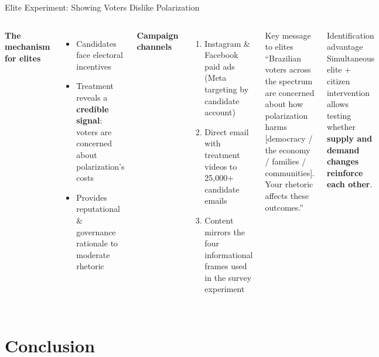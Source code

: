 \documentclass[aspectratio=169]{beamer}
\begin{document}
\begin{frame}{Elite Experiment: Showing Voters Dislike Polarization}
  \begin{columns}[T]
      \textbf{The mechanism for elites}
      \begin{itemize}
        \item Candidates face electoral incentives
        \item Treatment reveals a \textbf{credible signal}: voters are concerned about polarization's costs
        \item Provides reputational \& governance rationale to moderate rhetoric
      \end{itemize}
      \vspace{0.5em}
      \textbf{Campaign channels}
      \begin{enumerate}
        \item Instagram \& Facebook paid ads (Meta targeting by candidate account)
        \item Direct email with treatment videos to 25,000+ candidate emails
        \item Content mirrors the four informational frames used in the survey experiment
      \end{enumerate}
      \begin{block}{Key message to elites}
        \vspace{0.3em}
        ``Brazilian voters across the spectrum are concerned about how polarization harms [democracy / the economy / families / communities]. Your rhetoric affects these outcomes.''
      \end{block}
      \vspace{0.4em}
      \begin{exampleblock}{Identification advantage}
        Simultaneous elite + citizen intervention allows testing whether \textbf{supply and demand changes reinforce each other}.
      \end{exampleblock}
  \end{columns}
\end{frame}

\section{Conclusion}
\end{document}

